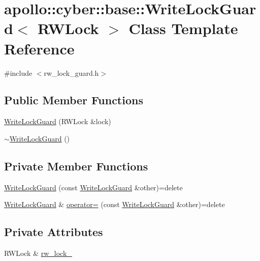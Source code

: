 \hypertarget{classapollo_1_1cyber_1_1base_1_1WriteLockGuard}{\section{apollo\-:\-:cyber\-:\-:base\-:\-:Write\-Lock\-Guard$<$ R\-W\-Lock $>$ Class Template Reference}
\label{classapollo_1_1cyber_1_1base_1_1WriteLockGuard}
}


{\ttfamily \#include $<$rw\-\_\-lock\-\_\-guard.\-h$>$}

\subsection*{Public Member Functions}
\begin{DoxyCompactItemize}
\item 
\hyperlink{classapollo_1_1cyber_1_1base_1_1WriteLockGuard_a5a54fdcd517e2550c75c366d38fed7d1}{Write\-Lock\-Guard} (R\-W\-Lock \&lock)
\item 
\hyperlink{classapollo_1_1cyber_1_1base_1_1WriteLockGuard_a5b096d60a5902cd02748fc16b5a6b3fd}{$\sim$\-Write\-Lock\-Guard} ()
\end{DoxyCompactItemize}
\subsection*{Private Member Functions}
\begin{DoxyCompactItemize}
\item 
\hyperlink{classapollo_1_1cyber_1_1base_1_1WriteLockGuard_abf94cbd1700acdaa580e73779006f405}{Write\-Lock\-Guard} (const \hyperlink{classapollo_1_1cyber_1_1base_1_1WriteLockGuard}{Write\-Lock\-Guard} \&other)=delete
\item 
\hyperlink{classapollo_1_1cyber_1_1base_1_1WriteLockGuard}{Write\-Lock\-Guard} \& \hyperlink{classapollo_1_1cyber_1_1base_1_1WriteLockGuard_aaf5945b578a48a45e8b85ad95c33e3b4}{operator=} (const \hyperlink{classapollo_1_1cyber_1_1base_1_1WriteLockGuard}{Write\-Lock\-Guard} \&other)=delete
\end{DoxyCompactItemize}
\subsection*{Private Attributes}
\begin{DoxyCompactItemize}
\item 
R\-W\-Lock \& \hyperlink{classapollo_1_1cyber_1_1base_1_1WriteLockGuard_a264e9c6ed5cfedf882fa8a8d4b5e9918}{rw\-\_\-lock\-\_\-}
\end{DoxyCompactItemize}


